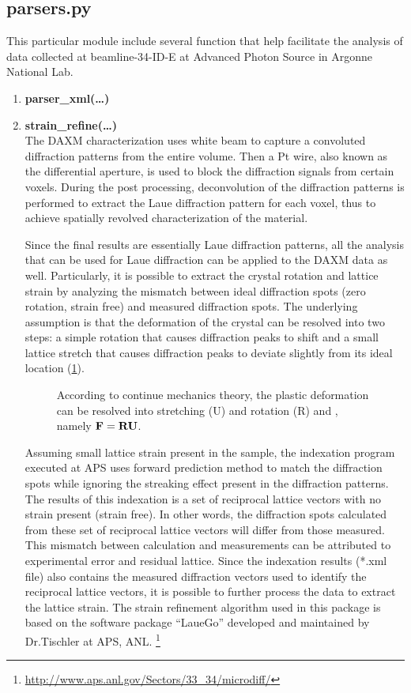 \documentclass[12pt]{scrartcl}
\begin{document}
\subsection{parsers.py}
This particular module include several function that help facilitate the analysis of data collected at beamline-34-ID-E at Advanced Photon Source in Argonne National Lab.
%
\begin{enumerate}

\item \textbf{parser\_xml(\ldots)} \\

\item \textbf{strain\_refine(\ldots)} \\
The DAXM characterization uses white beam to capture a convoluted diffraction patterns from the entire volume.
Then a Pt wire, also known as the differential aperture, is used to block the diffraction signals from certain voxels.
During the post processing, deconvolution of the diffraction patterns is performed to extract the Laue diffraction pattern for each voxel, thus to achieve spatially revolved characterization of the material.

Since the final results are essentially Laue diffraction patterns, all the analysis that can be used for Laue diffraction can be applied to the DAXM data as well.
Particularly, it is possible to extract the crystal rotation and lattice strain by analyzing the mismatch between ideal diffraction spots (zero rotation, strain free) and measured diffraction spots.
The underlying assumption is that the deformation of the crystal can be resolved into two steps: a simple rotation that causes diffraction peaks to shift and a small lattice stretch that causes diffraction peaks to deviate slightly from its ideal location (\cref{fig:srefine}).

\begin{figure}[htp]
\centering

\caption{%
According to continue mechanics theory, the plastic deformation can be resolved into stretching (\tnsr U) and rotation (\tnsr R) and , namely $\mathbf{F} = \mathbf{R} \mathbf{U}$. }
\label{fig:srefine}
\end{figure}

Assuming small lattice strain present in the sample, the indexation program executed at APS uses forward prediction method to match the diffraction spots while ignoring the streaking effect present in the diffraction patterns.
The results of this indexation is a set of reciprocal lattice vectors with no strain present (strain free).
In other words, the diffraction spots calculated from these set of reciprocal lattice vectors will differ from those measured.
This mismatch between calculation and measurements can be attributed to experimental error and residual lattice.
Since the indexation results (*.xml file) also contains the measured diffraction vectors used to identify the reciprocal lattice vectors, it is possible to further process the data to extract the lattice strain.
The strain refinement algorithm used in this package is based on the software package ``LaueGo'' developed and maintained by Dr.Tischler at APS, ANL.
\footnote{\url{http://www.aps.anl.gov/Sectors/33_34/microdiff/}}


\end{enumerate}
\end{document}

